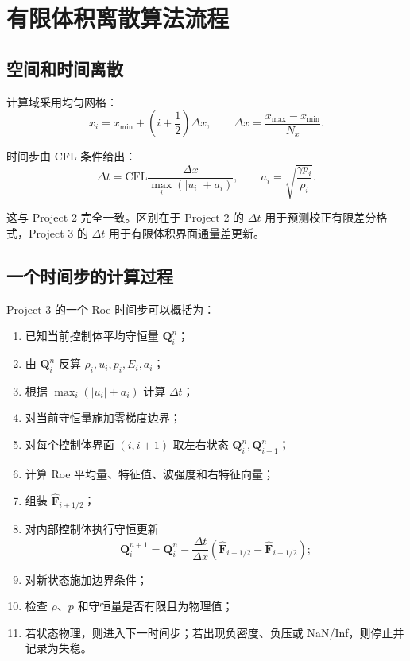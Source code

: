 \section{有限体积离散算法流程}

\subsection{空间和时间离散}

计算域采用均匀网格：
\begin{equation}
    x_i=x_{\min}+\left(i+\frac{1}{2}\right)\Delta x,
    \qquad
    \Delta x=\frac{x_{\max}-x_{\min}}{N_x}.
\end{equation}

时间步由 CFL 条件给出：
\begin{equation}
    \Delta t
    =
    \mathrm{CFL}
    \frac{\Delta x}
    {\max_i(|u_i|+a_i)},
    \qquad
    a_i=\sqrt{\frac{\gamma p_i}{\rho_i}}.
\end{equation}

这与 Project 2 完全一致。区别在于 Project 2 的 \(\Delta t\) 用于预测校正有限差分格式，Project 3 的 \(\Delta t\) 用于有限体积界面通量差更新。

\subsection{一个时间步的计算过程}

Project 3 的一个 Roe 时间步可以概括为：

\begin{enumerate}[leftmargin=2em]
    \item 已知当前控制体平均守恒量 \(\bm Q_i^n\)；
    \item 由 \(\bm Q_i^n\) 反算 \(\rho_i,u_i,p_i,E_i,a_i\)；
    \item 根据 \(\max_i(|u_i|+a_i)\) 计算 \(\Delta t\)；
    \item 对当前守恒量施加零梯度边界；
    \item 对每个控制体界面 \((i,i+1)\) 取左右状态 \(\bm Q_i^n,\bm Q_{i+1}^n\)；
    \item 计算 Roe 平均量、特征值、波强度和右特征向量；
    \item 组装 \(\hat{\bm F}_{i+1/2}\)；
    \item 对内部控制体执行守恒更新
    \[
        \bm Q_i^{n+1}
        =
        \bm Q_i^n
        -
        \frac{\Delta t}{\Delta x}
        \left(
            \hat{\bm F}_{i+1/2}
            -
            \hat{\bm F}_{i-1/2}
        \right);
    \]
    \item 对新状态施加边界条件；
    \item 检查 \(\rho\)、\(p\) 和守恒量是否有限且为物理值；
    \item 若状态物理，则进入下一时间步；若出现负密度、负压或 NaN/Inf，则停止并记录为失稳。
\end{enumerate}

